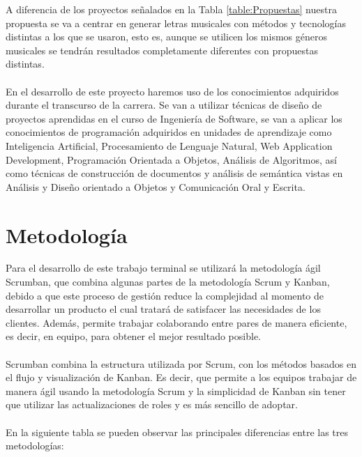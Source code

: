 \documentclass[12pt, a4paper, titlepage]{report}
\begin{document}
    	A diferencia de los proyectos señalados en la Tabla \ref{table:Propuestas} nuestra propuesta se va a centrar en generar letras musicales con métodos y tecnologías distintas a los que se usaron, esto es, aunque se utilicen los mismos géneros musicales se tendrán resultados completamente diferentes con propuestas distintas.\\\\
    	En el desarrollo de este proyecto haremos uso de los conocimientos adquiridos durante el transcurso de la carrera. Se van a utilizar técnicas de diseño de proyectos aprendidas en el curso de Ingeniería de Software, se van a aplicar los conocimientos de programación adquiridos en unidades de aprendizaje como Inteligencia Artificial, Procesamiento de Lenguaje Natural, Web Application Development, Programación Orientada a Objetos, Análisis de Algoritmos, así como técnicas de construcción de documentos y análisis de semántica vistas en Análisis y Diseño orientado a Objetos y Comunicación Oral y Escrita.
    	
	    \section{Metodología}
	    Para el desarrollo de este trabajo terminal se utilizará la metodología ágil Scrumban, que combina algunas partes de la metodología Scrum y Kanban, debido a que este proceso de gestión reduce la complejidad al momento de desarrollar un producto el cual tratará de satisfacer las necesidades de los clientes. Además, permite trabajar colaborando entre pares de manera eficiente, es decir, en equipo, para obtener el mejor resultado posible.\\\\
	    Scrumban combina la estructura utilizada por Scrum, con los métodos basados en el flujo y visualización de Kanban. Es decir, que permite a los equipos trabajar de manera ágil usando la metodología Scrum y la simplicidad de Kanban sin tener que utilizar las actualizaciones de roles y es más sencillo de adoptar.\\\\
	    En la siguiente tabla se pueden observar las principales diferencias entre las tres metodologías:
    
\end{document}
